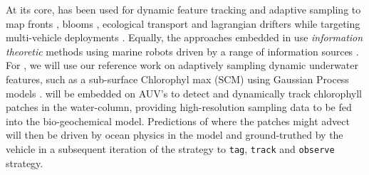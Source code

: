At its core, \rx has been used for dynamic feature tracking and
adaptive sampling to map fronts \cite{fronts11,smith14}, blooms
\cite{Das-2010-637}, ecological transport \cite{jdas12,jdas13} and
lagrangian drifters \cite{das10,das11a} while targeting multi-vehicle
deployments \cite{das11,Ferreira2018,pinto20}. Equally, the approaches
embedded in \rx use \emph{information theoretic} methods using marine
robots driven by a range of information sources
\cite{Das-2010-637,fronts11,olaya12,jdas12,jdas13,das15,fossum18,fossum19,fossum19b,fossum21}.
For \proj, we will use our reference work on adaptively sampling
dynamic underwater features, such as a sub-surface Chlorophyl max
(SCM) using Gaussian Process models \cite{fossum19}. \rx will be
embedded on AUV's to detect and dynamically track chlorophyll patches
in the water-column, providing high-resolution sampling data to be fed
into the bio-geochemical model. Predictions of where the patches might
advect will then be driven by ocean physics in the model and
ground-truthed by the vehicle in a subsequent iteration of the
strategy to \texttt{tag}, \texttt{track} and \texttt{observe}
strategy.



